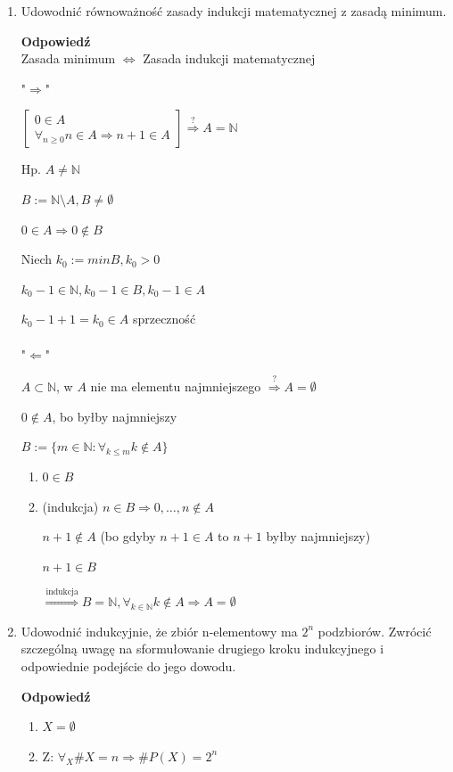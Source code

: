 \documentclass[12pt,a4paper]{article}
\theoremstyle{break}
\newcommand{\Odp}[1]{
		\begin{mdframed}[style=zadanie]
			\textbf{Odpowiedź}\\
			#1
		\end{mdframed}
	}
\begin{document}
\begin{enumerate}[1.]
	\item Udowodnić równoważność zasady indukcji matematycznej z zasadą minimum.
	\Odp{
		Zasada minimum $\Leftrightarrow$ Zasada indukcji matematycznej
		
		"$\Rightarrow$"
		
		$\begin{bmatrix}
			0\in A\\
			\forall_{n\geq 0} n\in A \Rightarrow n+1\in A
		\end{bmatrix} \overset{?}{\Rightarrow} A=\mathbb{N} $
	
		Hp. $A\neq \mathbb{N}$
		
		$B:= \mathbb{N}\setminus A, B\neq \emptyset$
		
		$0\in A \Rightarrow 0\notin B$
		
		Niech $k_0:= min B, k_0 >0$
		
		$k_0-1 \in \mathbb{N}, k_0-1\in B, k_0-1\in A$
		
		$k_0-1+1 = k_0 \in A$ sprzeczność\\\\
		
		"$\Leftarrow$"
		
		$A\subset \mathbb{N}$, w $A$ nie ma elementu najmniejszego $\overset{?}{\Rightarrow} A=\emptyset$
		
		$0\notin A$, bo byłby najmniejszy
		
		$B:= \{ m\in \mathbb{N}:\forall_{k\leq m} k\notin A\}$
		
		\begin{enumerate}[I]
			\item $0\in B$
			\item (indukcja) $n\in B \Rightarrow 0,\dots,n\notin A$
			
			$n+1\notin A$ (bo gdyby $n+1\in A$ to $n+1$ byłby najmniejszy)
			
			$n+1\in B$
			
			$\overset{\text{indukcja}}{\Rightarrow} B=\mathbb{N}, \forall_{k\in \mathbb{N}} k\notin A \Rightarrow A=\emptyset$
		\end{enumerate}
	}
	\newpage
	\item Udowodnić indukcyjnie, że zbiór n-elementowy ma $2^n$ podzbiorów. Zwrócić szczególną uwagę na sformułowanie drugiego kroku indukcyjnego i odpowiednie podejście do jego dowodu.
	\Odp{
		\begin{enumerate}[$1^\circ$]
			\item $X=\emptyset$
			\item Z: $\forall_X \#X=n \Rightarrow \#P(X)=2^n$
				

\end{enumerate}}
\end{enumerate}
\end{document}
